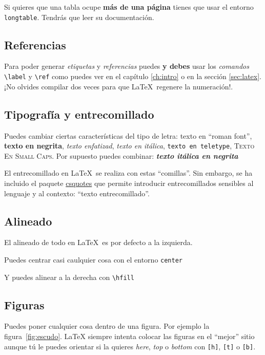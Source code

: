 Si quieres que una tabla ocupe \textbf{más de una página} tienes que
usar el entorno \verb|longtable|. Tendrás que leer su documentación.

\subsection{Referencias}

Para poder generar \emph{etiquetas} y \emph{referencias} puedes
\textbf{y debes} usar los \emph{comandos} \verb|\label| y
\verb|\ref| como puedes ver en el capítulo \ref{ch:intro} o en la
sección \ref{sec:latex}. ¡No olvides compilar dos veces para que
\LaTeX\ regenere la numeración!.

\subsection{Tipografía y entrecomillado}

Puedes cambiar ciertas características del tipo de letra: \textrm{texto en ``roman font''}, \textbf{texto en negrita}, \emph{texto enfatizad}, \textit{texto en itálica}, \texttt{texto en teletype}, \textsc{Texto En Small Caps}. Por supuesto puedes combinar: \textbf{\textit{texto itálica en negrita}}

El entrecomillado en \LaTeX\ se realiza con estas ``comillas''. Sin
embargo, se ha incluido el paquete \url{csquotes} que permite
introducir entrecomillados sensibles al lenguaje y al contexto:
\enquote{texto entrecomillado}.


\subsection{Alineado}
El alineado de todo en \LaTeX\ es por defecto a la izquierda.

\begin{center}
  Puedes centrar casi caulquier cosa con el entorno \verb!center!
\end{center}

\hfill
Y puedes alinear a la derecha con \verb!\hfill!

\subsection{Figuras}

Puedes poner cualquier cosa dentro de una figura. Por ejemplo la
figura~\ref{fig:escudo}. LaTeX siempre intenta colocar las figuras en
el ``mejor'' sitio aunque tú le puedes orientar si la quieres
\emph{here}, \emph{top} o \emph{bottom} con \verb|[h]|, \verb|[t]| o
\verb|[b]|.

